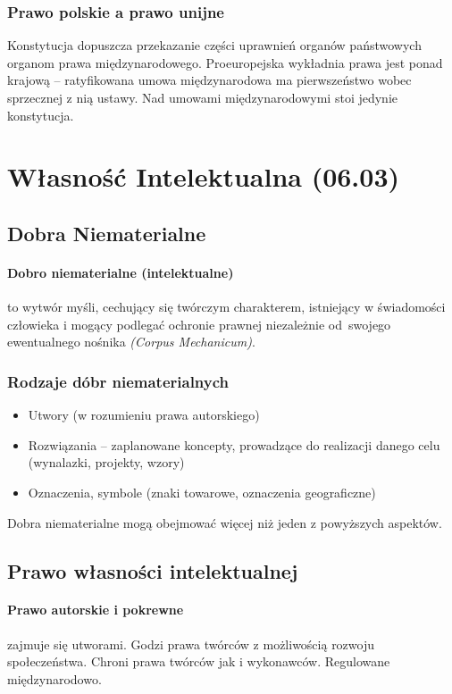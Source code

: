 \documentclass{article}
\begin{document}
\subsubsection{Prawo polskie a prawo unijne}
Konstytucja dopuszcza przekazanie części uprawnień organów państwowych organom prawa międzynarodowego.
Proeuropejska wykładnia prawa jest ponad krajową --
ratyfikowana umowa międzynarodowa ma pierwszeństwo wobec sprzecznej z nią ustawy.
Nad umowami międzynarodowymi stoi jedynie konstytucja.


\section{Własność Intelektualna (06.03)}

\subsection{Dobra Niematerialne}

\paragraph{Dobro niematerialne (intelektualne)}
to wytwór myśli, cechujący się twórczym charakterem, istniejący w świadomości człowieka
i mogący podlegać ochronie prawnej niezależnie od~swojego ewentualnego nośnika \textit{(Corpus Mechanicum)}.

\subsubsection{Rodzaje dóbr niematerialnych}
\begin{itemize}
  \item Utwory (w rozumieniu prawa autorskiego)
  \item Rozwiązania -- zaplanowane koncepty, prowadzące do realizacji danego celu (wynalazki, projekty, wzory)
  \item Oznaczenia, symbole (znaki towarowe, oznaczenia geograficzne)
\end{itemize}

Dobra niematerialne mogą obejmować więcej niż jeden z powyższych aspektów.

\subsection{Prawo własności intelektualnej}

\paragraph{Prawo autorskie i pokrewne}
zajmuje się utworami. Godzi prawa twórców z możliwością rozwoju społeczeństwa. Chroni prawa twórców jak i wykonawców. Regulowane międzynarodowo.
\end{document}
